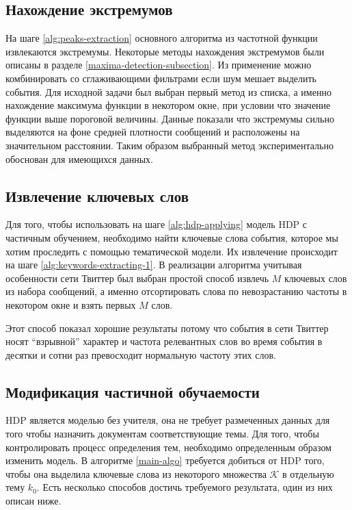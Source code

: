 \documentclass[12pt, a4paper]{article}
\begin{document}
  \subsection{Нахождение экстремумов}
  На шаге \ref{alg:peaks-extraction} основного алгоритма из частотной функции извлекаются экстремумы. Некоторые методы нахождения экстремумов были описаны в разделе \ref{maxima-detection-subsection}. Из применение можно комбинировать со сглаживающими фильтрами если шум мешает выделить события.
  Для исходной задачи был выбран первый метод из списка, а именно нахождение максимума функции в некотором окне, при условии что значение функции выше пороговой величины. Данные показали что экстремумы сильно выделяются на фоне средней плотности сообщений и расположены на значительном расстоянии. Таким образом выбранный метод экспериментально обоснован для имеющихся данных.  
  
  \subsection{Извлечение ключевых слов}
  Для того, чтобы использовать на шаге \ref{alg:hdp-applying} модель HDP с частичным обучением, необходимо найти ключевые слова события, которое мы хотим проследить с помощью тематической модели. Их извлечение происходит на шаге \ref{alg:keywords-extracting-1}. В реализации алгоритма учитывая особенности сети Твиттер был выбран простой способ извлечь $M$ ключевых слов из набора сообщений, а именно отсортировать слова по невозрастанию частоты в некотором окне и взять первых $M$ слов.
  
  Этот способ показал хорошие результаты потому что события в сети Твиттер носят ``взрывной'' характер и частота релевантных слов во время события в десятки и сотни раз превосходит нормальную частоту этих слов.
  
  \subsection{Модификация частичной обучаемости}
  HDP является моделью без учителя, она не требует размеченных данных для того чтобы назначить документам соответствующие темы. Для того, чтобы контролировать процесс определения тем, необходимо определенным образом изменить модель. В алгоритме \ref{main-algo} требуется добиться от HDP того, чтобы она выделила ключевые слова из некоторого множества $\mathcal{K}$ в отдельную тему $k_0$. Есть несколько способов достичь требуемого результата, один из них описан ниже.
  
\end{document}
